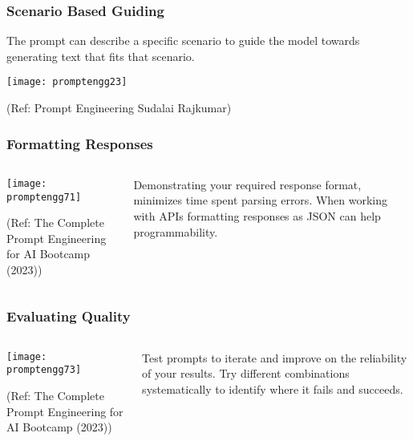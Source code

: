 \begin{frame}[fragile]\frametitle{ Scenario Based Guiding}

The prompt can describe a specific scenario to guide the model towards 
generating text that fits that scenario.

\begin{center}
\texttt{[image: promptengg23]}

{\tiny (Ref: Prompt Engineering Sudalai Rajkumar)}

\end{center}		

\end{frame}

\begin{frame}[fragile]\frametitle{Formatting Responses}

\begin{columns}
    \begin{column}[T]{0.6\linewidth}
		\begin{center}
		\texttt{[image: promptengg71]}

		{\tiny (Ref: The Complete Prompt Engineering for AI Bootcamp (2023))}
		\end{center}	
    \end{column}
    \begin{column}[T]{0.4\linewidth}
		Demonstrating your required response format, minimizes time spent parsing errors. 
		When working with APIs formatting responses as JSON can help programmability.
    \end{column}
  \end{columns}
\end{frame}

\begin{frame}[fragile]\frametitle{Evaluating Quality}

\begin{columns}
    \begin{column}[T]{0.6\linewidth}
		\begin{center}
		\texttt{[image: promptengg73]}

		{\tiny (Ref: The Complete Prompt Engineering for AI Bootcamp (2023))}
		\end{center}	
    \end{column}
    \begin{column}[T]{0.4\linewidth}
		Test prompts to iterate and improve on the reliability of your results.
		Try different combinations systematically to identify where it fails and succeeds.
    \end{column}
  \end{columns}
\end{frame}

